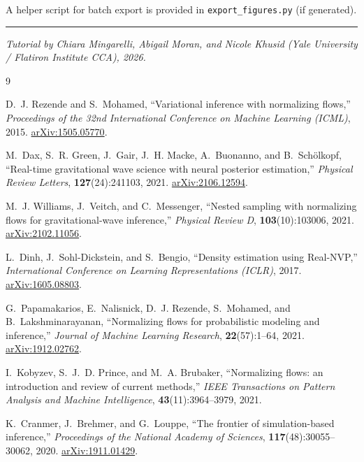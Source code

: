 \documentclass[11pt,letterpaper]{article}
\begin{document}
A helper script for batch export is provided in
\texttt{export\_figures.py} (if generated).

\vspace{1em}
\noindent\rule{\textwidth}{0.4pt}
\vspace{0.5em}
\noindent\textit{Tutorial by Chiara Mingarelli, Abigail Moran, and
Nicole Khusid (Yale University / Flatiron Institute CCA), 2026.}


\begin{thebibliography}{9}

D.~J. Rezende and S.~Mohamed,
``Variational inference with normalizing flows,''
\textit{Proceedings of the 32nd International Conference on Machine Learning (ICML)}, 2015.
\href{https://arxiv.org/abs/1505.05770}{arXiv:1505.05770}.

M.~Dax, S.~R. Green, J.~Gair, J.~H. Macke, A.~Buonanno, and B.~Sch\"olkopf,
``Real-time gravitational wave science with neural posterior estimation,''
\textit{Physical Review Letters}, \textbf{127}(24):241103, 2021.
\href{https://arxiv.org/abs/2106.12594}{arXiv:2106.12594}.

M.~J. Williams, J.~Veitch, and C.~Messenger,
``Nested sampling with normalizing flows for gravitational-wave inference,''
\textit{Physical Review D}, \textbf{103}(10):103006, 2021.
\href{https://arxiv.org/abs/2102.11056}{arXiv:2102.11056}.

L.~Dinh, J.~Sohl-Dickstein, and S.~Bengio,
``Density estimation using Real-NVP,''
\textit{International Conference on Learning Representations (ICLR)}, 2017.
\href{https://arxiv.org/abs/1605.08803}{arXiv:1605.08803}.

G.~Papamakarios, E.~Nalisnick, D.~J. Rezende, S.~Mohamed, and B.~Lakshminarayanan,
``Normalizing flows for probabilistic modeling and inference,''
\textit{Journal of Machine Learning Research}, \textbf{22}(57):1--64, 2021.
\href{https://arxiv.org/abs/1912.02762}{arXiv:1912.02762}.

I.~Kobyzev, S.~J.~D. Prince, and M.~A. Brubaker,
``Normalizing flows: an introduction and review of current methods,''
\textit{IEEE Transactions on Pattern Analysis and Machine Intelligence},
\textbf{43}(11):3964--3979, 2021.

K.~Cranmer, J.~Brehmer, and G.~Louppe,
``The frontier of simulation-based inference,''
\textit{Proceedings of the National Academy of Sciences},
\textbf{117}(48):30055--30062, 2020.
\href{https://arxiv.org/abs/1911.01429}{arXiv:1911.01429}.


\end{thebibliography}
\end{document}
